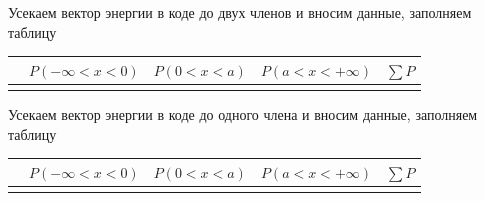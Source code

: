 \documentclass[12pt,a4paper]{article}
\begin{document}
Усекаем вектор энергии в коде до двух членов и вносим данные, заполняем таблицу

\begin{table}[H]
    \noindent
    \centering
    \begin{tabularx}{\textwidth}{|C|C|C|C|C|}
        \hline
        & \small $P(-\infty < x < 0)$ & \small $P(0 < x < a)$ & \small $P(a < x < +\infty)$ & $\sum P$ \\
        \hline
         \\
        \hline
    \end{tabularx}
\end{table}

Усекаем вектор энергии в коде до одного члена и вносим данные, заполняем таблицу

\begin{table}[H]
    \noindent
    \centering
    \begin{tabularx}{\textwidth}{|C|C|C|C|C|}
        \hline
        & \small $P(-\infty < x < 0)$ & \small $P(0 < x < a)$ & \small $P(a < x < +\infty)$ & $\sum P$ \\
        \hline
         \\
        \hline
    \end{tabularx}
\end{table}
\end{document}
